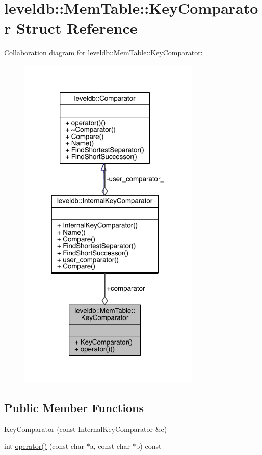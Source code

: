 \hypertarget{structleveldb_1_1_mem_table_1_1_key_comparator}{}\section{leveldb\+:\+:Mem\+Table\+:\+:Key\+Comparator Struct Reference}
\label{structleveldb_1_1_mem_table_1_1_key_comparator}


Collaboration diagram for leveldb\+:\+:Mem\+Table\+:\+:Key\+Comparator\+:\nopagebreak
\begin{figure}[H]
\begin{center}
\leavevmode
\includegraphics[width=246pt]{structleveldb_1_1_mem_table_1_1_key_comparator__coll__graph}
\end{center}
\end{figure}
\subsection*{Public Member Functions}
\begin{DoxyCompactItemize}
\item 
\hyperlink{structleveldb_1_1_mem_table_1_1_key_comparator_a6a7a9930dd478bb0f505d9418b76a593}{Key\+Comparator} (const \hyperlink{classleveldb_1_1_internal_key_comparator}{Internal\+Key\+Comparator} \&c)
\item 
int \hyperlink{structleveldb_1_1_mem_table_1_1_key_comparator_aa5bf375172b9c1877a4845fedb002f49}{operator()} (const char $\ast$a, const char $\ast$b) const 
\end{DoxyCompactItemize}
